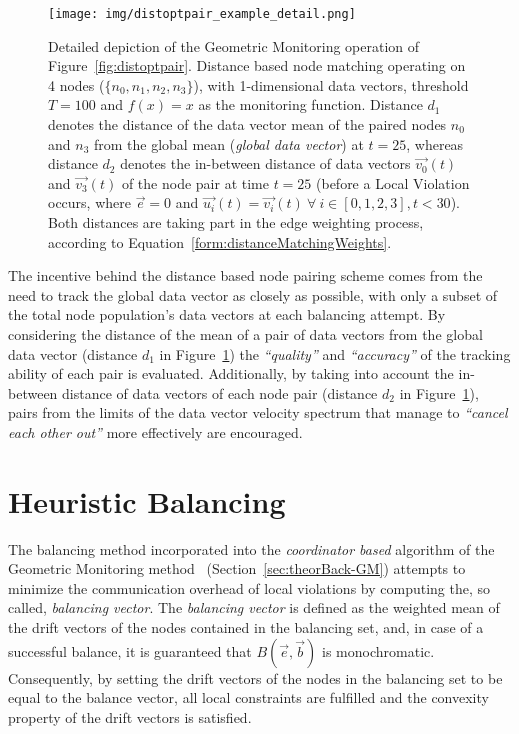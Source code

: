 \begin{figure}
        \centering
		\texttt{[image: img/distoptpair\_example\_detail.png]}
        \caption{Detailed depiction of the Geometric Monitoring operation of Figure~\ref{fig:distoptpair}. Distance based node matching operating on 4 nodes ($\{n_0, n_1, n_2, n_3\}$), with 1-dimensional data vectors, threshold $T=100$ and $f(x)=x$ as the monitoring function. Distance $d_1$ denotes the distance of the data vector mean of the paired nodes $n_0$ and $n_3$ from the global mean (\emph{global data vector}) at $t=25$, whereas distance $d_2$ denotes the in-between distance of data vectors $\vec{v_0}(t)$ and $\vec{v_3}(t)$ of the node pair at time $t=25$ (before a Local Violation occurs, where $\vec{e}=0$ and $\vec{u_i}(t)=\vec{v_i}(t)\ \forall\ i\in[0,1,2,3], t<30$). Both distances are taking part in the edge weighting process, according to Equation~\ref{form:distanceMatchingWeights}.} \label{fig:distoptpairdetailed}
\end{figure}%


The incentive behind the distance based node pairing scheme comes from the need to track the global data vector as closely as possible, with only a subset of the total node population's data vectors at each balancing attempt. By considering the distance of the mean of a pair of data vectors from the global data vector (distance $d_1$ in Figure~\ref{fig:distoptpairdetailed}) the \emph{``quality''} and \emph{``accuracy''} of the tracking ability of each pair is evaluated. Additionally, by taking into account the in-between distance of data vectors of each node pair (distance $d_2$ in Figure~\ref{fig:distoptpairdetailed}), pairs from the limits of the data vector velocity spectrum that manage to \emph{``cancel each other out''} more effectively are encouraged.

\section{Heuristic Balancing} \label{sec:impl-heuristic}

The balancing method incorporated into the \emph{coordinator based} algorithm of the Geometric Monitoring method~\cite{Sharfman2006GM} (Section~\ref{sec:theorBack-GM}) attempts to minimize the communication overhead of local violations by computing the, so called, \emph{balancing vector}. The \emph{balancing vector} is defined as the weighted mean of the drift vectors of the nodes contained in the balancing set, and, in case of a successful balance, it is guaranteed that $B(\vec{e}, \vec{b})$ is monochromatic. Consequently, by setting the drift vectors of the nodes in the balancing set to be equal to the balance vector, all local constraints are fulfilled and the convexity property of the drift vectors is satisfied.

